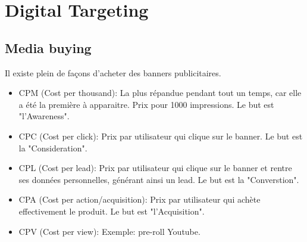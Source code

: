 \vspace{-1.2cm}

\section{Digital Targeting}

\subsection{Media buying}

Il existe plein de façons d'acheter des banners publicitaires.

\begin{itemize}
    \item CPM (Cost per thousand): La plus répandue pendant tout un temps, car elle a été la première à apparaitre. Prix pour 1000 impressions. Le but est "l'Awareness".
    \item CPC (Cost per click): Prix par utilisateur qui clique sur le banner. Le but est la "Consideration".
    \item CPL (Cost per lead): Prix par utilisateur qui clique sur le banner et rentre ses données personnelles, générant ainsi un lead. Le but est la "Converstion".
    \item CPA (Cost per action/acquisition): Prix par utilisateur qui achète effectivement le produit. Le but est "l'Acquisition".
    \item CPV (Cost per view): Exemple: pre-roll Youtube.\\
\end{itemize}

